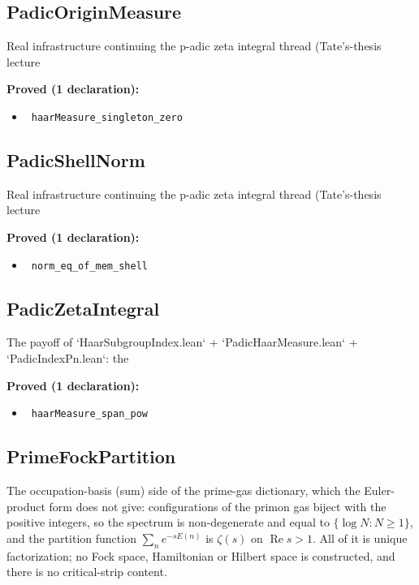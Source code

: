 \documentclass{report}
\theoremstyle{definition}
\begin{document}
\subsection{PadicOriginMeasure}
Real infrastructure continuing the p-adic zeta integral thread (Tate's-thesis lecture

\noindent\textbf{Proved (1 declaration):}
\begin{itemize}
  \item {}\leanok\ \texttt{haarMeasure\_singleton\_zero}
\end{itemize}

\subsection{PadicShellNorm}
Real infrastructure continuing the p-adic zeta integral thread (Tate's-thesis lecture

\noindent\textbf{Proved (1 declaration):}
\begin{itemize}
  \item {}\leanok\ \texttt{norm\_eq\_of\_mem\_shell}
\end{itemize}

\subsection{PadicZetaIntegral}
The payoff of `HaarSubgroupIndex.lean` + `PadicHaarMeasure.lean` + `PadicIndexPn.lean`: the

\noindent\textbf{Proved (1 declaration):}
\begin{itemize}
  \item {}\leanok\ \texttt{haarMeasure\_span\_pow}
\end{itemize}

\subsection{PrimeFockPartition}
The occupation-basis (sum) side of the prime-gas dictionary, which the Euler-product form
does not give: configurations of the primon gas biject with the positive integers, so the
spectrum is non-degenerate and equal to $\{\log N : N \geq 1\}$, and the partition function
$\sum_n e^{-sE(n)}$ is $\zeta(s)$ on $\operatorname{Re} s > 1$. All of it is unique
factorization; no Fock space, Hamiltonian or Hilbert space is constructed, and there is no
critical-strip content.
\end{document}
